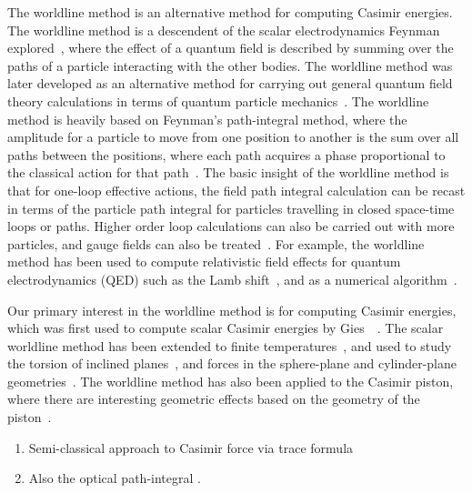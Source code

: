 The worldline method is an alternative method for computing Casimir energies.
The worldline method is a descendent of the scalar electrodynamics 
Feynman explored~\cite{Feynman1950}, where the effect of a quantum
field is described by summing over the paths of a particle interacting with the other bodies. 
The worldline method was later developed as an alternative method for 
carrying out general quantum field theory calculations in terms of quantum particle 
mechanics~\cite{McKeon1993, Strassler1992,Schubert2001}.  
The worldline method is heavily based on Feynman's path-integral method, where the amplitude
for a particle to move from one position to another is the sum over all paths between the positions,
where each path acquires a phase proportional to the classical action for that path~\cite{Feynman1948,Feynman1965}.
The basic insight of the worldline method is that for one-loop effective actions, 
the field path integral calculation can be recast in terms of the particle path
 integral for particles travelling in closed space-time loops or paths.
  Higher order loop calculations can also be carried out with more particles, 
and gauge fields can also be treated~\cite{Schubert2001}.
  For example, the worldline method has been used to compute relativistic
 field effects for quantum electrodynamics (QED) such as the Lamb shift~\cite{Schmidt1995},
 and as a numerical algorithm~\cite{Mazur2014}.

Our primary interest in the worldline method is for computing Casimir energies, 
which was first used to compute scalar Casimir energies by Gies~\etal~\cite{Gies2003,Gies2006, Gies2006a}.
The scalar worldline method has been extended to finite temperatures~\cite{Klingmueller2008},
and used to study the torsion of inclined planes~\cite{Weber2009},
and forces in the sphere-plane and cylinder-plane geometries~\cite{Weber2010, Weber2010a}.  
The worldline method has also been applied to the Casimir piston, where there are interesting geometric effects
based on the geometry of the piston~\cite{Schaden2009,Schaden2009a}.


\begin{enumerate}
  \item Semi-classical approach to Casimir force via trace formula~\cite{Schaden1998}
  \item Also the optical path-integral \cite{Scardicchio2005, Scardicchio2006}.
\end{enumerate}


